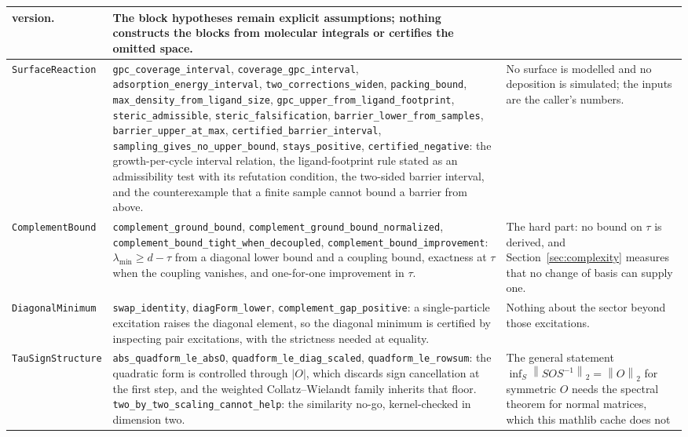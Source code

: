 \documentclass[11pt,a4paper]{article}
\theoremstyle{plain}
\theoremstyle{definition}
\theoremstyle{remark}
\newcommand{\norm}[1]{\left\lVert #1\right\rVert}
\newcommand{\abs}[1]{\left\lvert #1\right\rvert}
\begin{document}
\begin{longtable}{@{}>{\raggedright\arraybackslash}p{}>{\raggedright\arraybackslash}p{}>{\raggedright\arraybackslash}p{}@{}}
version. &
The block hypotheses remain explicit assumptions; nothing constructs the blocks
from molecular integrals or certifies the omitted space. \\
\hline
\texttt{SurfaceReaction} &
\texttt{gpc\_coverage\_interval}, \texttt{coverage\_gpc\_interval},
\texttt{adsorption\_energy\_interval}, \texttt{two\_corrections\_widen},
\texttt{packing\_bound}, \texttt{max\_density\_from\_ligand\_size},
\texttt{gpc\_upper\_from\_ligand\_footprint}, \texttt{steric\_admissible},
\texttt{steric\_falsification}, \texttt{barrier\_lower\_from\_samples},
\texttt{barrier\_upper\_at\_max}, \texttt{certified\_barrier\_interval},
\texttt{sampling\_gives\_no\_upper\_bound}, \texttt{stays\_positive},
\texttt{certified\_negative}: the growth-per-cycle interval relation, the
ligand-footprint rule stated as an admissibility test with its refutation
condition, the two-sided barrier interval, and the counterexample that a finite
sample cannot bound a barrier from above. &
No surface is modelled and no deposition is simulated; the inputs are the
caller's numbers. \\
\hline
\texttt{ComplementBound} &
\texttt{complement\_ground\_bound},
\texttt{complement\_ground\_bound\_normalized},
\texttt{complement\_bound\_tight\_when\_decoupled},
\texttt{complement\_bound\_improvement}: $\lambda_{\min}\ge d-\tau$ from a
diagonal lower bound and a coupling bound, exactness at $\tau$ when the coupling
vanishes, and one-for-one improvement in $\tau$. &
The hard part: no bound on $\tau$ is derived, and
Section~\ref{sec:complexity} measures that no change of basis can supply one. \\
\hline
\texttt{DiagonalMinimum} &
\texttt{swap\_identity}, \texttt{diagForm\_lower},
\texttt{complement\_gap\_positive}: a single-particle excitation raises the
diagonal element, so the diagonal minimum is certified by inspecting pair
excitations, with the strictness needed at equality. &
Nothing about the sector beyond those excitations. \\
\hline
\texttt{TauSignStructure} &
\texttt{abs\_quadform\_le\_absO}, \texttt{quadform\_le\_diag\_scaled},
\texttt{quadform\_le\_rowsum}: the quadratic form is controlled through
$\abs{O}$, which discards sign cancellation at the first step, and the weighted
Collatz--Wielandt family inherits that floor.
\texttt{two\_by\_two\_scaling\_cannot\_help}: the similarity no-go, kernel-checked
in dimension two. &
The general statement $\inf_S\norm{SOS^{-1}}_2=\norm{O}_2$ for symmetric $O$
needs the spectral theorem for normal matrices, which this mathlib cache does not

\end{longtable}
\end{document}
